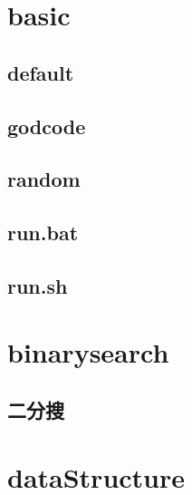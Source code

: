 \documentclass[a4paper,10pt,twocolumn,oneside]{article}
\begin{document}
\pagestyle{fancy}
\fancyfoot{}
\fancyhead[R]{\thepage}
\renewcommand{\headrulewidth}{0.4pt}
\renewcommand{\contentsname}{Contents} 

\newcommand{\includetex}[2]{
  \subsection{#1}
  
  \vspace{-1.2em}
}
\scriptsize
\tableofcontents

\section{basic}
    \subsection{default}
    

    \subsection{godcode}
    

    \subsection{random}
    

    \subsection{run.bat}
    

    \subsection{run.sh}
    

\section{binarysearch}
    \subsection{二分搜}
    

\section{dataStructure}
\end{document}
